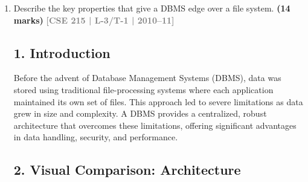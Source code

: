 \documentclass[12pt,a3paper]{article}
\newcommand{\yr}[1]{\hfill\textcolor{gray}{\small\textbf{[#1]}}}
\newcommand{\mk}[1]{\textcolor{orange!70!black}{\small\textbf{(#1 marks)}}}
\begin{document}
\begin{enumerate}
\begin{tcolorbox}[enhanced,breakable,ansbox,colback=cA!4,colframe=cA,boxrule=0.8pt,arc=5pt,title={\textbf{Answer}},fonttitle=\bfseries\color{white},colbacktitle=cA]
\subsubsection*{C. Disk Storage (Data Structures)}
This represents the physical layer where the information is permanently written.
\begin{itemize}
    \item \textbf{Data Files:} The actual files residing on the disk that store the database records.
    \item \textbf{Data Dictionary (Metadata):} Stores data about the data, including table schemas, constraints, user permissions, and statistical data used by the query optimizer.
    \item \textbf{Indices:} Auxiliary data structures (such as B+ Trees or Hash tables) that provide fast access to data items based on key values, bypassing sequential scans.
\end{itemize}


\end{tcolorbox}

\item Describe the key properties that give a DBMS edge over a file system.
\mk{14} \yr{CSE 215 | L-3/T-1 | 2010--11}

\begin{tcolorbox}[enhanced,breakable,ansbox,colback=cA!4,colframe=cA,boxrule=0.8pt,arc=5pt,title={\textbf{Answer}},fonttitle=\bfseries\color{white},colbacktitle=cA]

\subsection*{1. Introduction}
Before the advent of Database Management Systems (DBMS), data was stored using traditional file-processing systems where each application maintained its own set of files. This approach led to severe limitations as data grew in size and complexity. A DBMS provides a centralized, robust architecture that overcomes these limitations, offering significant advantages in data handling, security, and performance.

\subsection*{2. Visual Comparison: Architecture}


\end{tcolorbox}
\end{enumerate}
\end{document}

